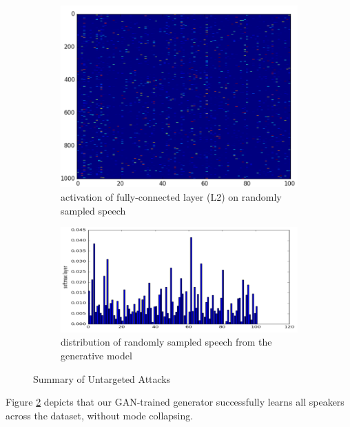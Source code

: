 \begin{figure}[t]
    \centering
    \begin{subfigure}[b]{0.4\textwidth}
        \includegraphics[width=\textwidth]{./fig/conf_mat_untargeted.png}
        \caption{activation of fully-connected layer (L2) on randomly sampled speech}
        \label{fig:yoyo_untargeted}
    \end{subfigure}
    \qquad
    \begin{subfigure}[b]{0.4\textwidth}
        \includegraphics[width=\textwidth]{./fig/histogram_untargeted.png}
        \caption{distribution of randomly sampled speech from the generative model}
        \label{fig:histogram_untargeted}
    \end{subfigure}
    \caption{Summary of Untargeted Attacks}
    \label{fig:histogram_summary}
\end{figure}

Figure \ref{fig:histogram_untargeted} depicts that our GAN-trained generator successfully learns all speakers across the dataset, without mode collapsing.

